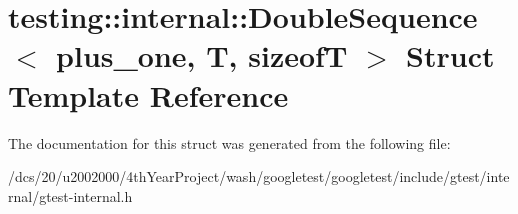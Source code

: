 \hypertarget{structtesting_1_1internal_1_1DoubleSequence}{}\section{testing\+:\+:internal\+:\+:Double\+Sequence$<$ plus\+\_\+one, T, sizeofT $>$ Struct Template Reference}
\label{structtesting_1_1internal_1_1DoubleSequence}


The documentation for this struct was generated from the following file\+:\begin{DoxyCompactItemize}
\item 
/dcs/20/u2002000/4th\+Year\+Project/wash/googletest/googletest/include/gtest/internal/gtest-\/internal.\+h\end{DoxyCompactItemize}
